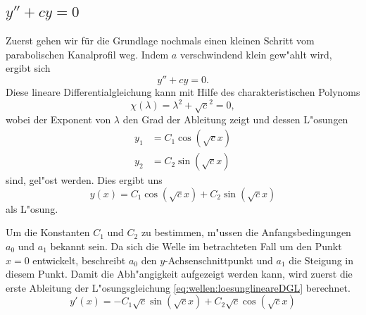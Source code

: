\subsection{\texorpdfstring{$y''+cy = 0$}{y''+cy = 0}}
Zuerst gehen wir für die Grundlage nochmals einen kleinen Schritt vom 
parabolischen Kanalprofil weg. Indem $a$ verschwindend klein gew"ahlt wird, 
ergibt sich
\begin{equation}
	y''+ cy = 0.
	\label{eq:wellen:lineareDGL}
\end{equation}
Diese lineare Differentialgleichung kann mit Hilfe des charakteristischen 
Polynoms
\begin{equation*}
	\chi(\lambda) = \lambda^2+\sqrt{c}^2 = 0,
\end{equation*}
wobei der Exponent von $\lambda$ den Grad der Ableitung zeigt und dessen 
L"osungen
\begin{equation*}
	\begin{split}
		y_1 &= C_1\cos(\sqrt{c} x) \\
		y_2 &= C_2\sin(\sqrt{c} x)
	\end{split}
\end{equation*}
sind, gel"ost werden. Dies ergibt uns
\begin{equation}
	y(x) = C_1 \cos(\sqrt{c}x) + C_2 \sin(\sqrt{c}x)
	\label{eq:wellen:loesunglineareDGL}
\end{equation}
als L"osung.

Um die Konstanten $C_1$ und $C_2$ zu bestimmen, m"ussen die Anfangsbedingungen 
$a_0$ und $a_1$ bekannt sein. Da sich die Welle im betrachteten Fall um den 
Punkt $x=0$ entwickelt, beschreibt $a_0$ den $y$-Achsenschnittpunkt und $a_1$ die 
Steigung in diesem Punkt. Damit die Abh"angigkeit aufgezeigt werden kann, wird 
zuerst die erste Ableitung der L"osungsgleichung 
\eqref{eq:wellen:loesunglineareDGL} berechnet.
\begin{equation*}
	y'(x)=-C_1 \sqrt{c} \sin(\sqrt{c}x) + C_2 \sqrt{c} \cos(\sqrt{c}x)
\end{equation*}

